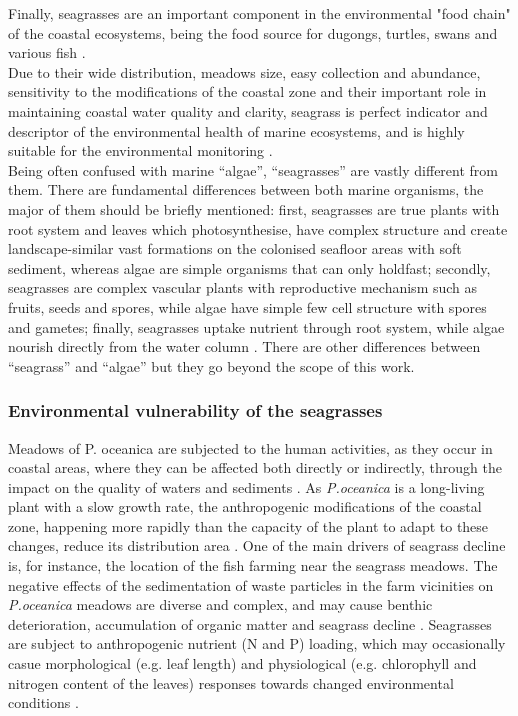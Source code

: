 \documentclass[10pt, a4paper]{article}
\begin{document}
Finally, seagrasses are an important component in the environmental "food chain" of the coastal
ecosystems, being the food source for dugongs, turtles, swans and various fish \cite{Cappo95}\label{Cappo95}.\\
Due to their wide distribution, meadows size, easy collection and abundance, sensitivity to the
modifications of the coastal zone and their important role in maintaining coastal water quality
and clarity, seagrass is perfect indicator and descriptor of the environmental health of marine
ecosystems, and is highly suitable for the environmental monitoring \cite{Pergent-Martini05}\label{Pergent-Martini05}.\\
Being often confused with marine “algae”, “seagrasses” are vastly different from them. There are
fundamental differences between both marine organisms, the major of them should be briefly
mentioned: first, seagrasses are true plants with root system and leaves which photosynthesise, have
complex structure and create landscape-similar vast formations on the colonised seafloor areas with
soft sediment, whereas algae are simple organisms that can only holdfast; secondly, seagrasses are
complex vascular plants with reproductive mechanism such as fruits, seeds and spores, while algae
have simple few cell structure with spores and gametes; finally, seagrasses uptake nutrient through
root system, while algae nourish directly from the water column \cite{Dixon05}\label{Dixon05}. There are other
differences between “seagrass” and “algae” but they go beyond the scope of this work.

\subsubsection{Environmental vulnerability of the seagrasses}
Meadows of P. oceanica are subjected to the human activities, as they occur in coastal areas, where
they can be affected both directly \cite{Meinesz91}\label{Meinesz91} or indirectly, through the impact on the
quality of waters and sediments \cite{Duarte02}\label{Duarte02}. As \textit{P.oceanica} is a long-living plant with a slow
growth rate, the anthropogenic modifications of the coastal zone, happening more rapidly than the
capacity of the plant to adapt to these changes, reduce its distribution area \cite{Micheli05}\label{Micheli05}. One
of the main drivers of seagrass decline is, for instance, the location of the fish farming near the
seagrass meadows. The negative effects of the sedimentation of waste particles in the farm vicinities
on \textit{P.oceanica} meadows are diverse and complex, and may cause benthic deterioration, accumulation
of organic matter and seagrass decline \cite{Holmer08}\label{Holmer08}. Seagrasses are subject to anthropogenic
nutrient (N and P) loading, which may occasionally casue morphological (e.g. leaf length) and
physiological (e.g. chlorophyll and nitrogen content of the leaves) responses towards changed
environmental conditions \cite{Leoni06,Leoni07}\label{Leoni06} \label{Leoni07}. 
\end{document}
